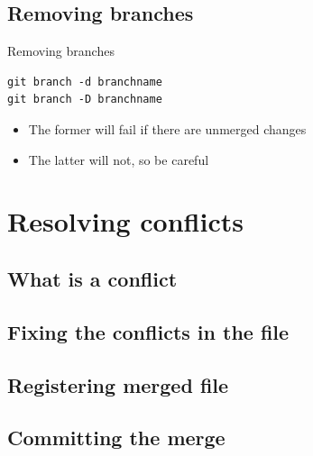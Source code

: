 \documentclass[10pt,a4paper]{beamer}
\begin{document}
\subsection{Removing branches}
\begin{frame}[fragile]{Removing branches}
\begin{verbatim}
git branch -d branchname
git branch -D branchname
\end{verbatim}
\begin{itemize}
\item The former will fail if there are unmerged changes
\item The latter will not, so be careful
\end{itemize}
\end{frame}


\section{Resolving conflicts}

\subsection{What is a conflict}
\begin{frame}

\end{frame}

\subsection{Fixing the conflicts in the file}
\begin{frame}

\end{frame}

\subsection{Registering merged file}
\begin{frame}

\end{frame}

\subsection{Committing the merge}
\begin{frame}

\end{frame}
\end{document}
